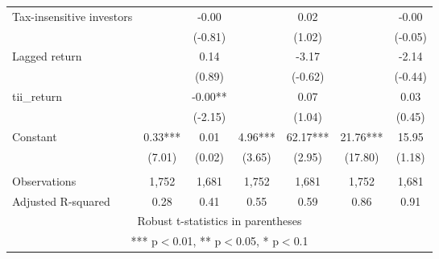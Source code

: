 \documentclass[]{article}
\begin{document}
\begin{tabular}{lcccccc}
Tax-insensitive investors &  & -0.00 &  & 0.02 &  & -0.00 \\
 &  & (-0.81) &  & (1.02) &  & (-0.05) \\
Lagged return &  & 0.14 &  & -3.17 &  & -2.14 \\
 &  & (0.89) &  & (-0.62) &  & (-0.44) \\
tii\_return &  & -0.00** &  & 0.07 &  & 0.03 \\
 &  & (-2.15) &  & (1.04) &  & (0.45) \\
Constant & 0.33*** & 0.01 & 4.96*** & 62.17*** & 21.76*** & 15.95 \\
 & (7.01) & (0.02) & (3.65) & (2.95) & (17.80) & (1.18) \\
 &  &  &  &  &  &  \\
Observations & 1,752 & 1,681 & 1,752 & 1,681 & 1,752 & 1,681 \\
 Adjusted R-squared & 0.28 & 0.41 & 0.55 & 0.59 & 0.86 & 0.91 \\ \hline
\multicolumn{7}{c}{ Robust t-statistics in parentheses} \\
\multicolumn{7}{c}{ *** p$<$0.01, ** p$<$0.05, * p$<$0.1} \\
\end{tabular}
\end{document}
